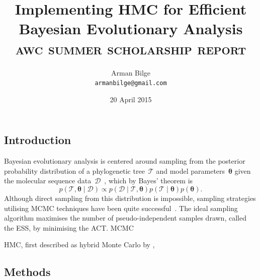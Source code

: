 \documentclass{article}
\title{Implementing \acl{HMC} for Efficient Bayesian Evolutionary Analysis \\
           \Large\textsc{awc summer scholarship report}}
\author{Arman Bilge \\ \texttt{armanbilge@gmail.com}}
\date{20 April 2015}
\renewcommand{\vec}[1]{\ensuremath{\boldsymbol{\mathbf{#1}}}}
\begin{document}
    \maketitle

    \subsection*{Introduction}

    Bayesian evolutionary analysis is centered around sampling from the
        posterior probability distribution of a phylogenetic
        tree~$\mathcal{T}$ and model parameters~$\vec\theta$
        given the molecular sequence data~$\mathcal{D}$~\cite{Bou+14},
        which by Bayes' theorem is
        \begin{equation}
            p\left(\mathcal{T}, \vec\theta \mid \mathcal{D}\right)
                \propto p\left(\mathcal{D} \mid \mathcal{T},\vec\theta\right)
                p\left(\mathcal{T} \mid \vec\theta\right) p\left(\vec\theta\right).
        \end{equation}
    Although direct sampling from this distribution is impossible, sampling
        strategies utilising \ac{MCMC} techniques have been quite
        successful~\cite{RH03,Dru+12,Bou+14}.
    The ideal sampling algorithm maximises the number of pseudo-independent
        samples drawn, called the \ac{ESS}, by minimising the \ac{ACT}.
    \ac{MCMC}

    \ac{HMC}, first described as hybrid Monte Carlo by \textcite{Dua+87},

    \subsection*{Methods}
\end{document}
